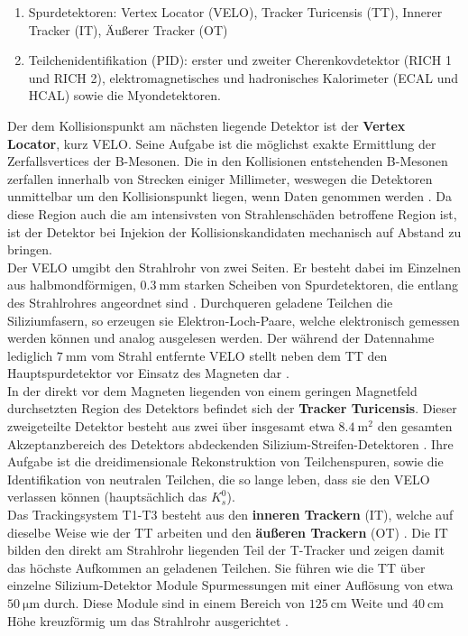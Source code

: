 %
\begin{enumerate}
  \item Spurdetektoren: Vertex Locator (VELO), Tracker Turicensis (TT), Innerer Tracker (IT), Äußerer Tracker (OT)
  \item Teilchenidentifikation (PID): erster und zweiter Cherenkovdetektor (RICH 1 und RICH 2), elektromagnetisches und hadronisches Kalorimeter (ECAL und HCAL) sowie die Myondetektoren.
\end{enumerate}
%
Der dem Kollisionspunkt am nächsten liegende Detektor ist der \textbf{Vertex Locator}, kurz VELO. Seine Aufgabe ist die möglichst exakte Ermittlung der Zerfallsvertices der B-Mesonen. Die in den Kollisionen entstehenden B-Mesonen zerfallen innerhalb von Strecken einiger Millimeter, weswegen die Detektoren unmittelbar um den Kollisionspunkt liegen, wenn Daten genommen werden \cite{velo}. Da diese Region auch die am intensivsten von Strahlenschäden betroffene Region ist, ist der Detektor bei Injekion der Kollisionskandidaten mechanisch auf Abstand zu bringen.\\
Der VELO umgibt den Strahlrohr von zwei Seiten. Er besteht dabei im Einzelnen aus halbmondförmigen, $\SI{0.3}{\milli\meter}$ starken Scheiben von Spurdetektoren, die entlang des Strahlrohres angeordnet sind \cite{velo}. Durchqueren geladene Teilchen die Siliziumfasern, so erzeugen sie Elektron-Loch-Paare, welche elektronisch gemessen werden können und analog ausgelesen werden. Der während der Datennahme lediglich $\SI{7}{\milli\meter}$ vom Strahl entfernte VELO stellt neben dem TT den Hauptspurdetektor vor Einsatz des Magneten dar \cite{velo}. \\
%
In der direkt vor dem Magneten liegenden von einem geringen Magnetfeld durchsetzten Region des Detektors befindet sich der \textbf{Tracker Turicensis}. Dieser zweigeteilte Detektor besteht aus zwei über insgesamt etwa $\SI{8.4}{\meter\squared}$ den gesamten Akzeptanzbereich des Detektors abdeckenden Silizium-Streifen-Detektoren \cite{lhcb}. Ihre Aufgabe ist die dreidimensionale Rekonstruktion von Teilchenspuren, sowie die Identifikation von neutralen Teilchen, die so lange leben, dass sie den VELO verlassen können (hauptsächlich das $K_s^0$).\\
%
Das Trackingsystem T1-T3 besteht aus den \textbf{inneren Trackern} (IT), welche auf dieselbe Weise wie der TT arbeiten und den \textbf{äußeren Trackern} (OT) \cite{tracker}. Die IT bilden den direkt am Strahlrohr liegenden Teil der T-Tracker und zeigen damit das höchste Aufkommen an geladenen Teilchen. Sie führen wie die TT über einzelne Silizium-Detektor Module Spurmessungen mit einer Auflösung von etwa $\SI{50}{\micro\meter}$ durch. Diese Module sind in einem Bereich von $\SI{125}{\centi\meter}$ Weite und $\SI{40}{\centi\meter}$ Höhe kreuzförmig um das Strahlrohr ausgerichtet \cite{tracker}.\\
